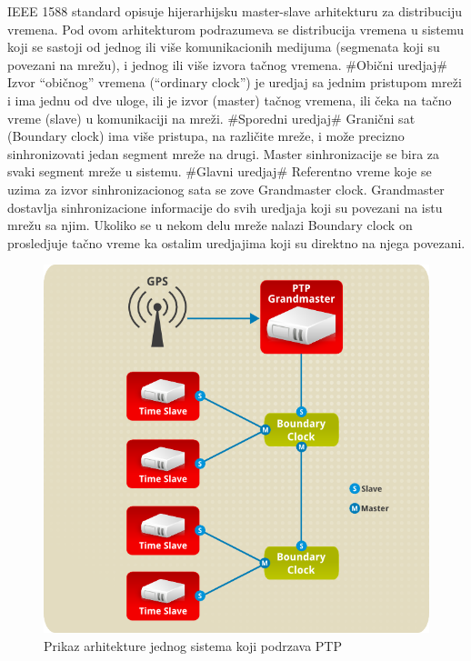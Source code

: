 \documentclass[a4paper,12pt, master]{etf}
\begin{document}
	IEEE 1588 standard opisuje hijerarhijsku master-slave arhitekturu za
	distribuciju vremena. Pod ovom arhitekturom podrazumeva se distribucija
	vremena u sistemu koji se sastoji od jednog ili vi\v{s}e komunikacionih
	medijuma (segmenata koji su povezani na mre\v{z}u), i jednog ili vi\v{s}e
	izvora ta\v{c}nog vremena. \#Obi\v{c}ni uredjaj\# Izvor ``obi\v{c}nog''
	vremena (``ordinary clock'') je uredjaj sa jednim pristupom mre\v{z}i i ima
	jednu od dve uloge, ili je izvor (master) ta\v{c}nog vremena, ili \v{c}eka
	na ta\v{c}no vreme (slave) u komunikaciji na mre\v{z}i. \#Sporedni
	uredjaj\# Grani\v{c}ni sat (Boundary clock) ima vi\v{s}e pristupa, na
	razli\v{c}ite mre\v{z}e, i mo\v{z}e precizno sinhronizovati jedan segment
	mre\v{z}e na drugi. Master sinhronizacije se bira za svaki segment
	mre\v{z}e u sistemu. \#Glavni uredjaj\# Referentno vreme koje se uzima za
	izvor sinhronizacionog sata se zove Grandmaster clock. Grandmaster
	dostavlja sinhronizacione informacije do svih uredjaja koji su povezani na
	istu mre\v{z}u sa njim. Ukoliko se u nekom delu mre\v{z}e nalazi Boundary
	clock on prosledjuje ta\v{c}no vreme ka ostalim uredjajima koji su direktno
	na njega povezani.

	\begin{figure}[htb]
			\centering
			\includegraphics[scale=.3]{../pic/arch_ptp_system.png}
			\caption{Prikaz arhitekture jednog sistema koji podrzava PTP}
			\label{fig:arch_ptp_system}
	\end{figure}
\end{document}
